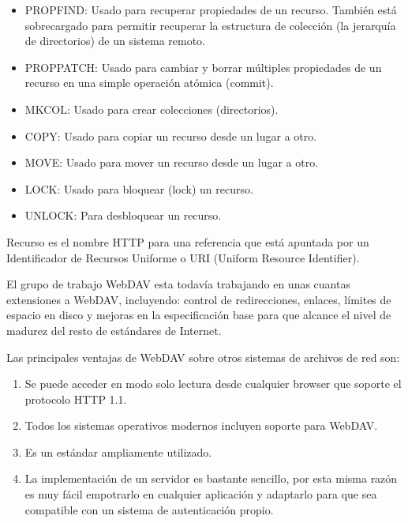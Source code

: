 \begin{itemize}

	\item PROPFIND: Usado para recuperar propiedades de un recurso. También está sobrecargado para permitir recuperar la estructura de colección (la jerarquía de directorios) de un sistema remoto.
	
	\item PROPPATCH: Usado para cambiar y borrar múltiples propiedades de un recurso en una simple operación atómica (commit).
	
	\item MKCOL: Usado para crear colecciones (directorios).
	
	\item COPY: Usado para copiar un recurso desde un lugar a otro.
	
	\item MOVE: Usado para mover un recurso desde un lugar a otro.
	
	\item LOCK: Usado para bloquear (lock) un recurso.
	
	\item UNLOCK: Para desbloquear un recurso.

\end{itemize}

Recurso es el nombre HTTP para una referencia que está apuntada por un Identificador de Recursos Uniforme o URI (Uniform Resource Identifier).

El grupo de trabajo WebDAV esta todavía trabajando en unas cuantas extensiones a WebDAV, incluyendo: control de redirecciones, enlaces, límites de espacio en disco y mejoras en la especificación base para que alcance el nivel de madurez del resto de estándares de Internet.

Las principales ventajas de WebDAV sobre otros sistemas de archivos de red son:

\begin{enumerate}

	\item Se puede acceder en modo solo lectura desde cualquier browser que soporte el protocolo HTTP 1.1.
	
	\item Todos los sistemas operativos modernos incluyen soporte para WebDAV.
	
	\item Es un estándar ampliamente utilizado.
	
	\item La implementación de un servidor es bastante sencillo, por esta misma razón es muy fácil empotrarlo en cualquier aplicación y adaptarlo para que sea compatible con un sistema de autenticación propio.
	
\end{enumerate}


